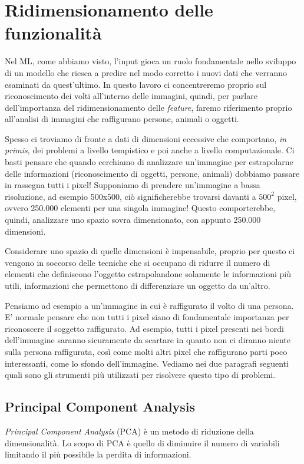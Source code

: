 \documentclass[12pt,italian]{report}
\begin{document}
\section{Ridimensionamento delle funzionalità}

Nel ML, come abbiamo visto, l'input gioca un ruolo fondamentale nello sviluppo di un modello che riesca a predire nel modo corretto i nuovi dati che verranno esaminati da quest'ultimo.
In questo lavoro ci concentreremo proprio sul riconoscimento dei volti all'interno delle immagini, quindi, per parlare dell'importanza del ridimensionamento delle \emph{feature}, faremo riferimento proprio all'analisi di immagini che raffigurano persone, animali o oggetti.

Spesso ci troviamo di fronte a dati di dimensioni eccessive che comportano, \emph{in primis}, dei problemi a livello tempistico e poi anche a livello computazionale. Ci basti pensare che quando cerchiamo di analizzare un'immagine per estrapolarne delle informazioni (riconoscimento di oggetti, persone, animali) dobbiamo passare in rassegna tutti i pixel! Supponiamo di prendere un'immagine a bassa risoluzione, ad esempio 500x500, ciò significherebbe trovarsi davanti a $ 500^2 $ pixel, ovvero 250.000 elementi per una singola immagine! Questo comporterebbe, quindi, analizzare uno spazio sovra dimensionato, con appunto 250.000 dimensioni.

Considerare uno spazio di quelle dimensioni è impensabile, proprio per questo ci vengono in soccorso delle tecniche che si occupano di ridurre il numero di elementi che definiscono l'oggetto estrapolandone solamente le informazioni più utili, informazioni che permettono di differenziare un oggetto da un'altro.

Pensiamo ad esempio a un'immagine in cui è raffigurato il volto di una persona. E' normale pensare che non tutti i pixel siano di fondamentale importanza per riconoscere il soggetto raffigurato. Ad esempio, tutti i pixel presenti nei bordi dell'immagine saranno sicuramente da scartare in quanto non ci diranno niente sulla persona raffigurata, così come molti altri pixel che raffigurano parti poco interessanti, come lo sfondo dell'immagine. Vediamo nei due paragrafi seguenti quali sono gli strumenti più utilizzati per risolvere questo tipo di problemi.


\subsection{Principal Component Analysis}
\emph{Principal Component Analysis} (PCA) è un metodo di riduzione della dimensionalità. Lo scopo di PCA è quello di diminuire il numero di variabili limitando il più possibile la perdita di informazioni. 
\end{document}
